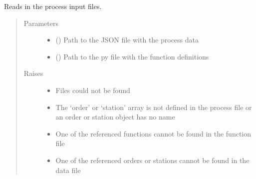 \documentclass[letterpaper,10pt,english]{sphinxmanual}
\begin{document}
\begin{fulllineitems}
\begin{fulllineitems}
\end{fulllineitems}


\begin{fulllineitems}
\label{\detokenize{source/API/api:environment.Environment.read_files}}
\sphinxAtStartPar
Reads in the process input files.
\begin{quote}\begin{description}
\item[{Parameters}] \leavevmode\begin{itemize}
\item {} 
\sphinxAtStartPar
{} () \textendash{} Path to the JSON file with the process data

\item {} 
\sphinxAtStartPar
{} () \textendash{} Path to the py file with the function definitions

\end{itemize}

\item[{Raises}] \leavevmode\begin{itemize}
\item {} 
\sphinxAtStartPar
{} \textendash{} Files could not be found

\item {} 
\sphinxAtStartPar
{} \textendash{} The ‘order’ or ‘station’ array is not defined in the process file or an order or
station object has no name

\item {} 
\sphinxAtStartPar
{} \textendash{} One of the referenced functions cannot be found in the function file

\item {} 
\sphinxAtStartPar
{} \textendash{} One of the referenced orders or stations cannot be found in the data file


\end{itemize}
\end{description}
\end{quote}
\end{fulllineitems}
\end{fulllineitems}
\end{document}
